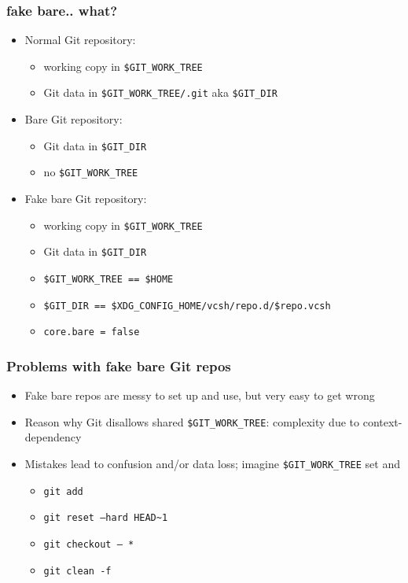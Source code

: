 \documentclass[t]{beamer}
\begin{document}
\begin{frame}
	\frametitle{fake bare.. what?}
	\begin{itemize}
		\item Normal Git repository:
		\begin{itemize}
			\item working copy in \texttt{\$GIT\_WORK\_TREE}
			\item Git data in \texttt{\$GIT\_WORK\_TREE/.git} aka \texttt{\$GIT\_DIR}
		\end{itemize}
		\item Bare Git repository:
		\begin{itemize}
			\item Git data in \texttt{\$GIT\_DIR}
			\item no  \texttt{\$GIT\_WORK\_TREE}
		\end{itemize}
		\item Fake bare Git repository:
		\begin{itemize}
			\item working copy in \texttt{\$GIT\_WORK\_TREE}
			\item Git data in \texttt{\$GIT\_DIR}
			\item \texttt{\$GIT\_WORK\_TREE == \$HOME}
			\item \texttt{\$GIT\_DIR == \$XDG\_CONFIG\_HOME/vcsh/repo.d/\$repo.vcsh}
			\item \texttt{core.bare = false}
		\end{itemize}
	\end{itemize}
\end{frame}

\begin{frame}
	\frametitle{Problems with fake bare Git repos}
	\begin{itemize}
		\item Fake bare repos are messy to set up and use, but very easy to get wrong
		\item Reason why Git disallows shared \texttt{\$GIT\_WORK\_TREE}: complexity due to context-dependency
		\item Mistakes lead to confusion and/or data loss; imagine \texttt{\$GIT\_WORK\_TREE} set and
		\begin{itemize}
			\item \texttt{git add}
			\item \texttt{git reset --hard HEAD\~{}1}
			\item \texttt{git checkout -- *}
			\item \texttt{git clean -f}
		\end{itemize}
	\end{itemize}
\end{frame}
\end{document}
